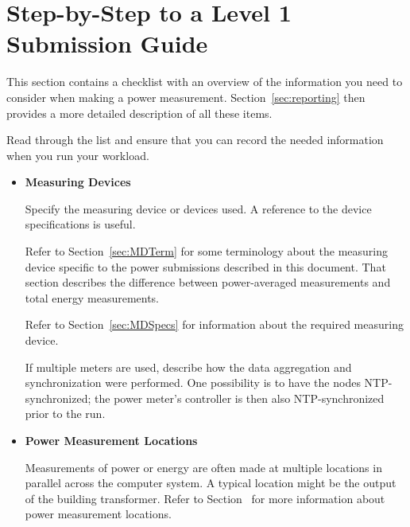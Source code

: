 \chapter{Step-by-Step to a Level 1 Submission Guide}
\label{sec:checklist}

This section contains a checklist with an overview of the information you need to consider when making a power measurement.
Section~\ref{sec:reporting} then provides a more detailed description of all these items.

Read through the list and ensure that you can record the needed 
information when you run your workload.

\begin{itemize}
\item[{[ ]}]
\textbf{Measuring Devices}

Specify the measuring device or devices used.
A reference to the device specifications is useful.

Refer to Section~\ref{sec:MDTerm} for some terminology about the measuring device specific to the power submissions described in this document.
That section describes the difference between power-averaged measurements and total energy measurements.

Refer to Section~\ref{sec:MDSpecs} for information about the required measuring device.

If multiple meters are used, describe how the data aggregation and synchronization were performed.
One possibility is to have the nodes NTP-synchronized; the power meter's controller is then also NTP-synchronized prior to the run.



\item[{[ ]}]
\textbf{Power Measurement Locations}

Measurements of power or energy are often made at multiple locations in parallel across the computer system.
A typical location might be the output of the building transformer.
Refer to Section~ for more information about power measurement locations.


\end{itemize}
